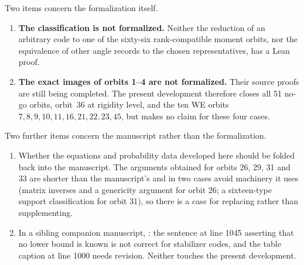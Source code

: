 \documentclass[11pt,a4paper]{article}
\theoremstyle{definition}
\begin{document}
Two items concern the formalization itself.

\begin{enumerate}
\item \textbf{The classification is not formalized.} Neither the reduction of an
  arbitrary code to one of the sixty-six rank-compatible moment orbits, nor the
  equivalence of other angle records to the chosen representatives, has a Lean
  proof.
\item \textbf{The exact images of orbits 1--4 are not formalized.} Their source
  proofs are still being completed. The present development therefore closes
  all 51 no-go orbits, orbit~36 at rigidity level, and the ten WE orbits
  $7,8,9,10,11,16,21,22,23,45$, but makes no claim for these four cases.
\end{enumerate}

Two further items concern the manuscript rather than the formalization.

\begin{enumerate}
\item Whether the equations and probability data developed here should be folded
  back into the manuscript. The arguments obtained for orbits 26, 29, 31 and 33
  are shorter than the manuscript's and in two cases avoid machinery it uses
  (matrix inverses and a genericity argument for orbit 26; a sixteen-type support
  classification for orbit 31), so there is a case for replacing rather than
  supplementing.
\item In a sibling companion manuscript, : the
  sentence at line 1045 asserting that no lower bound is known is not correct for
  stabilizer codes, and the table caption at line 1000 needs revision. Neither
  touches the present development.
\end{enumerate}
\end{document}
